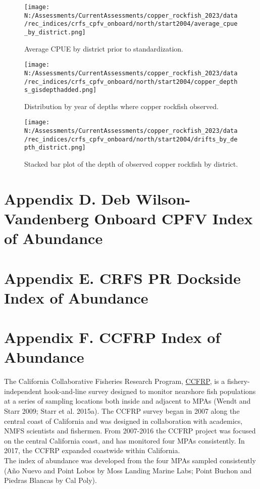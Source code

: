 \documentclass[11pt,
  english,
  letterpaper,
]{article}
\begin{document}
\begin{figure}
\centering
\texttt{[image: N:/Assessments/CurrentAssessments/copper\_rockfish\_2023/data/rec\_indices/crfs\_cpfv\_onboard/north/start2004/average\_cpue\_by\_district.png]}
\caption{Average CPUE by district prior to standardization.\label{fig:onboard-regioncpue}}
\end{figure}

\newpage

\begin{figure}
\centering
\texttt{[image: N:/Assessments/CurrentAssessments/copper\_rockfish\_2023/data/rec\_indices/crfs\_cpfv\_onboard/north/start2004/copper\_depths\_gisdepthadded.png]}
\caption{Distribution by year of depths where copper rockfish observed.\label{fig:onboard-depths}}
\end{figure}

\newpage

\begin{figure}
\centering
\texttt{[image: N:/Assessments/CurrentAssessments/copper\_rockfish\_2023/data/rec\_indices/crfs\_cpfv\_onboard/north/start2004/drifts\_by\_depth\_district.png]}
\caption{Stacked bar plot of the depth of observed copper rockfish by district.\label{fig:onboard-depths}}
\end{figure}

\newpage

\hypertarget{dwv-cpfv-index}{%
\section{Appendix D. Deb Wilson-Vandenberg Onboard CPFV Index of Abundance}\label{dwv-cpfv-index}}

\hypertarget{crfs-pr-index}{%
\section{Appendix E. CRFS PR Dockside Index of Abundance}\label{crfs-pr-index}}

\hypertarget{ccfrp-index}{%
\section{Appendix F. CCFRP Index of Abundance}\label{ccfrp-index}}

The California Collaborative Fisheries Research Program, \href{https://www.mlml.calstate.edu/ccfrp/}{CCFRP}, is a fishery-independent hook-and-line survey designed to monitor nearshore fish populations at a series of sampling locations both inside and adjacent to MPAs (Wendt and Starr 2009; Starr et al. 2015a). The CCFRP survey began in 2007 along the central coast of California and was designed in collaboration with academics, NMFS scientists and fishermen. From 2007-2016 the CCFRP project was focused on the central California coast, and has monitored four MPAs consistently. In 2017, the CCFRP expanded coastwide within California.\\
The index of abundance was developed from the four MPAs sampled consistently (Año Nuevo and Point Lobos by Moss Landing Marine Labs; Point Buchon and Piedras Blancas by Cal Poly).
\end{document}
